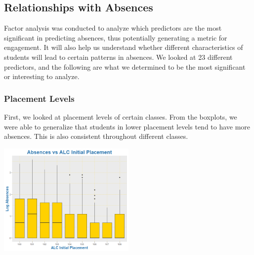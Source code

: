 \documentclass[12pt,letterpaper]{article}
\begin{document}
\subsection{Relationships with Absences}

Factor analysis was conducted to analyze which predictors are the most significant in predicting absences, thus potentially generating a metric for engagement. It will also help us understand whether different characteristics of students will lead to certain patterns in absences. We looked at 23 different predictors, and the following are what we determined to be the most significant or interesting to analyze.

\subsubsection{Placement Levels}

First, we looked at placement levels of certain classes. From the boxplots, we were able to generalize that students in lower placement levels tend to have more absences. This is also consistent throughout different classes.

\begin{center}
    \includegraphics[width = 0.5\textwidth]{Plots/1. ALC Initial Placement.png}
\end{center}
\end{document}

